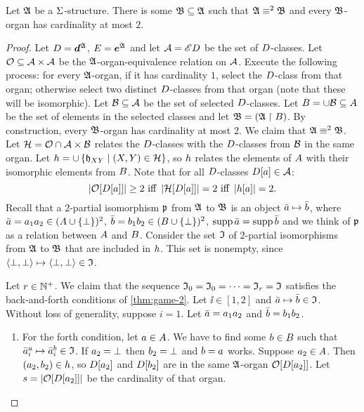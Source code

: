 \begin{lemma}\label{lem:twovar-organ-2}
Let $\mathfrak{A}$ be a $\mathrm{\Sigma}$-structure. There is some $\mathfrak{B} \subseteq \mathfrak{A}$ such
that $\mathfrak{A} \equiv^{2} \mathfrak{B}$ and every $\mathfrak{B}$-organ has cardinality at most
$2$.
\end{lemma}
\begin{proof}
Let $D = \bm{d}^{\mathfrak{A}}$, $E = \bm{e}^{\mathfrak{A}}$ and 
let $\mathcal{A} = {\mathscr{E}D}$ be the set of $D$-classes.
Let $\mathcal{O} \subseteq {\mathcal{A}\times\mathcal{A}}$ be the
$\mathfrak{A}$-organ-equivalence relation on $\mathcal{A}$.
Execute the following process: for every $\mathfrak{A}$-organ, if it has cardinality
$1$, select the $D$-class from that organ; otherwise select two distinct
$D$-classes from that organ (note that these will be isomorphic).
Let $\mathcal{B} \subseteq \mathcal{A}$ be the set of selected $D$-classes.
Let $B = \cup \mathcal{B} \subseteq A$ be the set of elements in the
selected classes and let $\mathfrak{B} = (\mathfrak{A} \restriction B)$.
By construction, every $\mathfrak{B}$-organ has cardinality at most $2$.
We claim that $\mathfrak{A} \equiv^{2} \mathfrak{B}$.
Let $\mathcal{H} = \mathcal{O} \cap \mathcal{A}\times\mathcal{B}$ relates the $D$-classes with the
$D$-classes from $\mathcal{B}$ in the same organ.
Let $h = \cup \left\{\mathfrak{h}_{XY}\mathrel{}\middle|\mathrel{}(X,Y) \in \mathcal{H}\right\}$, so
$h$ relates the elements of $A$ with their isomorphic elements from
$B$.
Note that for all $D$-classes $D[a] \in \mathcal{A}$:
\begin{equation}\label{eq:twovar-organ-2}
  \mifff{
  \card{\Org[\relD[\ea]]} \geq 2}{
  \card{\selH[\relD[\ea]]} = 2}{
  \card{\selh[\ea]} = 2}.
\end{equation}
Recall that a $2$-partial isomorphism $\mathfrak{p}$ from $\mathfrak{A}$ to $\mathfrak{B}$ is an
object $\bar{a} \mapsto \bar{b}$, where
$\bar{a} = a_{1}a_{2} \in (A \cup \left\{\bot\right\})^2$,
$\bar{b}  = b_{1}b_{2} \in (B \cup \left\{\bot\right\})^2$,
$\operatorname{supp}\bar{a} = \operatorname{supp}\bar{b}$
and we think of $\mathfrak{p}$ as a relation between $A$ and $B$.
Consider the set $\mathfrak{I}$ of $2$-partial isomorphisms from
$\mathfrak{A}$ to $\mathfrak{B}$ that are included in $h$.
This set is nonempty, since $\left\langle \bot,\bot \right\rangle\mapsto\left\langle \bot,\bot \right\rangle \in \mathfrak{I}$.

Let $r \in \mathbb{N}^{+}$.
We claim that the sequence $\mathfrak{I}_{0} = \mathfrak{I}_{0} = \dots = \mathfrak{I}_{r} = \mathfrak{I}$
satisfies the back-and-forth conditions of \cref{thm:game-2}.
Let $\ii \in [1,2]$ and $\bar{a} \mapsto \bar{b} \in \mathfrak{I}$.
Without loss of generality, suppose $i = 1$.
Let $\bar{a} = a_{1}a_{2}$ and $\bar{b} = b_{1}b_{2}$.
\begin{enumerate}
  \item For the forth condition, let $a \in A$.
  We have to find some $b \in B$ such that
  $\bar{a}_{i}^{a} \mapsto \bar{a}_{i}^{b} \in \mathfrak{I}$.
  If $a_{2} = \bot$ then $b_{2} = \bot$ and $b = a$ works.
  Suppose $a_{2} \in A$. Then $(a_{2},b_{2}) \in h$, so
  $D[a_{2}]$ and $D[b_{2}]$ are in the same $\mathfrak{A}$-organ
  $\mathcal{O}[D[a_{2}]]$.
  Let $s = \left|\mathcal{O}[D[a_{2}]]\right|$ be the cardinality of that organ.
 

\end{enumerate}
\end{proof}
